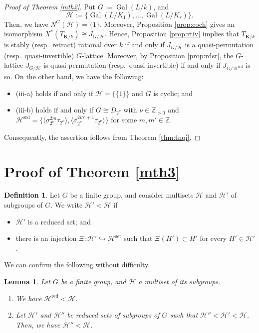 \documentclass[12pt]{amsart}
\theoremstyle{plain}
\newtheorem{lem}[thm]{Lemma}
\theoremstyle{definition}
\newtheorem{dfn}[thm]{Definition}
\numberwithin{thm}{section}
\numberwithin{equation}{section}
\newcommand{\Zpn}{\mathbb{Z}_{>0}}
\newcommand{\Z}{\mathbb{Z}}
\newcommand{\bK}{\mathbf{K}}
\newcommand{\cH}{\mathcal{H}}
\DeclareMathOperator{\Gal}{Gal}
\DeclareMathOperator{\red}{red}
\DeclareMathOperator{\set}{set}
\DeclareMathOperator{\srd}{srd}
\begin{document}
\begin{proof}[Proof of Theorem \ref{mth2}]
Put $G:=\Gal(L/k)$, and
\begin{equation*}
\cH:=\{\Gal(L/K_{1}),\ldots,\Gal(L/K_{r})\}. 
\end{equation*}
Then, we have $N^{G}(\cH)=\{1\}$. Moreover, Proposition \ref{prop:coch} gives an isomorphism $X^{*}(T_{\bK/k})\cong J_{G/\cH}$. Hence, Proposition \ref{prop:rtiv} implies that $T_{\bK/k}$ is stably (resp.~retract) rational over $k$ if and only if $J_{G/\cH}$ is a quasi-permutation (resp.~quasi-invertible) $G$-lattice. Moreover, by Proposition \ref{prop:rdsr}, the $G$-lattice $J_{G/\cH}$ is quasi-permutation (resp.~quasi-invertible) if and only if $J_{G/\cH^{\srd}}$ is so. On the other hand, we have the following:
\begin{itemize}
\item (iii-a) holds if and only if $\cH=\{\{1\}\}$ and $G$ is cyclic; and
\item (iii-b) holds if and only if $G\cong D_{2^{\nu}}$ with $\nu \in \Zpn$ and $\cH^{\srd}=\{\langle \sigma_{2^{\nu}}^{2m}\tau_{2^{\nu}}\rangle,\langle \sigma_{2^{\nu}}^{2m'+1}\tau_{2^{\nu}}\rangle\}$ for some $m,m'\in \Z$. 
\end{itemize}
Consequently, the assertion follows from Theorem \ref{thm:tnqi}. 
\end{proof}

\section{Proof of Theorem \ref{mth3}}\label{sect:nilp}

\begin{dfn}
Let $G$ be a finite group, and consider multisets $\cH$ and $\cH'$ of subgroups of $G$. We write $\cH'<\cH$ if
\begin{itemize}
\item $\cH'$ is a reduced set; and
\item there is an injection $\Xi \colon \cH' \hookrightarrow \cH^{\set}$ such that $\Xi(H')\subset H'$ for every $H'\in \cH'$. 
\end{itemize}
\end{dfn}

We can confirm the following without difficulty. 

\begin{lem}\label{lem:msin}
Let $G$ be a finite group, and $\cH$ a multiset of its subgroups. 
\begin{enumerate}
    \item We have $\cH^{\red}<\cH$. 
    \item Let $\cH'$ and $\cH''$ be reduced sets of subgroups of $G$ such that $\cH''<\cH'<\cH$. Then, we have $\cH''<\cH$. 
\end{enumerate}
\end{lem}
\end{document}
